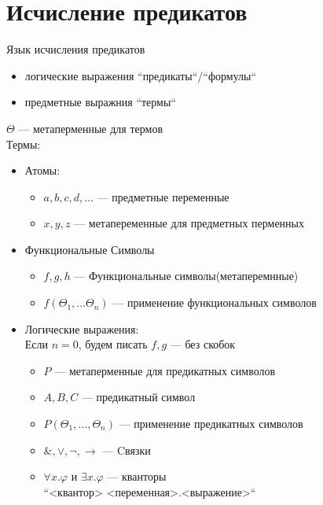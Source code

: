 \documentclass[oneside]{book}
\begin{document}
\section{Исчисление предикатов}
\label{sec:orgcbaef0d}
\begin{definition}
	Язык исчисления предикатов
	\begin{itemize}
		\item логические выражения ``предикаты``/``формулы``
		\item предметные выражния ``термы``
	\end{itemize}
	\(\Theta\) --- метаперменные для термов \\
	Термы:
	\begin{itemize}
		\item Атомы:
		      \begin{itemize}
			      \item \(a, b, c, d, \dots\) --- предметные переменные
			      \item \(x, y, z\) --- метапеременные для предметных перменных
		      \end{itemize}
		\item Функциональные Символы
		      \begin{itemize}
			      \item \(f, g, h\) --- Функциональные символы(метаперемнные)
			      \item \(f(\Theta_1, \dots \Theta_n)\) --- применение функциональных символов
		      \end{itemize}
		\item Логические выражения: \\
		      \color{gray}Если \(n = 0\), будем писать \(f, g\) --- без скобок\color{black}
		      \begin{itemize}
			      \item \(P\) --- метаперменные для предикатных символов
			      \item \(A, B, C\) --- предикатный символ
			      \item \(P(\Theta_1, \dots, \Theta_n)\) --- применение предикатных символов
			      \item \(\&, \vee, \neg, \to\) --- Cвязки
			      \item \(\forall x.\varphi\) и \(\exists x.\varphi\) --- кванторы \\
			            \color{gray}``<квантор> <переменная>.<выражение>``\color{black} \\
		      \end{itemize}
	\end{itemize}
	\label{org5be07d2}
\end{definition}
\end{document}
